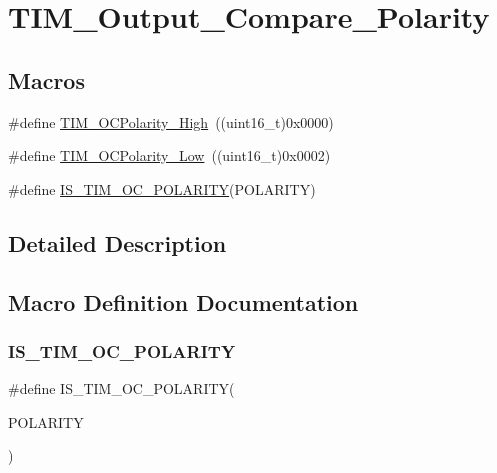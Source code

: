 \hypertarget{group___t_i_m___output___compare___polarity}{}\section{T\+I\+M\+\_\+\+Output\+\_\+\+Compare\+\_\+\+Polarity}
\label{group___t_i_m___output___compare___polarity}
\subsection*{Macros}
\begin{DoxyCompactItemize}
\item 
\#define \mbox{\hyperlink{group___t_i_m___output___compare___polarity_gaba2f2de6fd722b8973e0eddeb8644022}{T\+I\+M\+\_\+\+O\+C\+Polarity\+\_\+\+High}}~((uint16\+\_\+t)0x0000)
\item 
\#define \mbox{\hyperlink{group___t_i_m___output___compare___polarity_ga9f4b11953dbd2c6f836b6913469dcf54}{T\+I\+M\+\_\+\+O\+C\+Polarity\+\_\+\+Low}}~((uint16\+\_\+t)0x0002)
\item 
\#define \mbox{\hyperlink{group___t_i_m___output___compare___polarity_ga1c2ee68d587d4f48d935c82fe4c3fe1e}{I\+S\+\_\+\+T\+I\+M\+\_\+\+O\+C\+\_\+\+P\+O\+L\+A\+R\+I\+TY}}(P\+O\+L\+A\+R\+I\+TY)
\end{DoxyCompactItemize}


\subsection{Detailed Description}


\subsection{Macro Definition Documentation}
\mbox{\label{group___t_i_m___output___compare___polarity_ga1c2ee68d587d4f48d935c82fe4c3fe1e}} 
\subsubsection{\texorpdfstring{IS\_TIM\_OC\_POLARITY}{IS\_TIM\_OC\_POLARITY}}
{\footnotesize\ttfamily \#define I\+S\+\_\+\+T\+I\+M\+\_\+\+O\+C\+\_\+\+P\+O\+L\+A\+R\+I\+TY(\begin{DoxyParamCaption}\item[{}]{P\+O\+L\+A\+R\+I\+TY }\end{DoxyParamCaption})}

